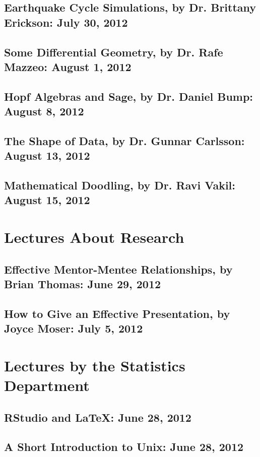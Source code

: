 \documentclass[twosided,openany]{book}
\begin{document}
    \section{Earthquake Cycle Simulations, by Dr. Brittany Erickson: July 30, 2012}
	
    \section{Some Differential Geometry, by Dr. Rafe Mazzeo: August 1, 2012}
	
    \section{Hopf Algebras and {\sc Sage}, by Dr. Daniel Bump: August 8, 2012}
	
    \section{The Shape of Data, by Dr. Gunnar Carlsson: August 13, 2012}
	
    \section{Mathematical Doodling, by Dr. Ravi Vakil: August 15, 2012}
	
\chapter{Lectures About Research}
    \section{Effective Mentor-Mentee Relationships, by Brian Thomas: June 29, 2012}
	
    \section{How to Give an Effective Presentation, by Joyce Moser: July 5, 2012}
	
\chapter{Lectures by the Statistics Department}
    \section{RStudio and \LaTeX{}: June 28, 2012}
	
    \section{A Short Introduction to Unix: June 28, 2012}
	
\end{document}
